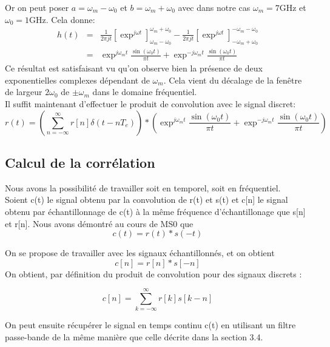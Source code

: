\documentclass[10pt,a4paper]{article}
\begin{document}
Or on peut poser $a=\omega_m-\omega_0$ et $b=\omega_m+\omega_0$ avec dans notre cas $\omega_m=7\text{GHz}$ et $\omega_0=1\text{GHz}$. Cela donne:
\begin{eqnarray*}
h(t) & = &\frac{1}{2\pi j t}\left[ \exp^{j\omega t}\right]_{\omega_m-\omega_0}^{\omega_m+\omega_0} - \frac{1}{2\pi j t}\left[ \exp^{j\omega t}\right]_{-\omega_m+\omega_0}^{-\omega_m-\omega_0}\\
& = & \exp^{j\omega_m t}\frac{\sin (\omega_0 t)}{\pi t} + \exp^{-j\omega_m t}\frac{\sin (\omega_0 t)}{\pi t}
\end{eqnarray*}
Ce résultat est satisfaisant vu qu'on observe bien la présence de deux exponentielles complexes dépendant de $\omega_m$. Cela vient du décalage de la fenêtre de largeur $2\omega_0$ de $\pm \omega_m$ dans le domaine fréquentiel.\\
Il suffit maintenant d'effectuer le produit de convolution avec le signal discret:
\begin{equation}
r(t)=\left(\sum_{n=-\infty}^{\infty}r[n]\delta (t-nT_e)\right)\ast \left( \exp^{j\omega_m t}\frac{\sin (\omega_0 t)}{\pi t} + \exp^{-j\omega_m t}\frac{\sin (\omega_0 t)}{\pi t} \right)
\end{equation}

 \subsection{Calcul de la corrélation}

Nous avons la possibilité de travailler soit en temporel, soit en fréquentiel.\\

Soient c(t) le signal obtenu par la convolution de r(t) et s(t) et c[n] le signal obtenu par échantillonnage de c(t) à la même fréquence d'échantillonage que s[n] et r[n]. Nous avons démontré au cours de MS0 que
\begin{equation}
c(t)=r(t)*s(-t)
\end{equation}

On se propose de travailler avec les signaux échantillonnés, et on obtient
\begin{equation}
c[n]=r[n]*s[-n]
\end{equation}
On obtient, par définition du produit de convolution pour des signaux discrets :

\begin{equation}
c[n]=\sum_{k=-\infty}^{\infty}r[k]s[k-n]
\end{equation}

On peut ensuite récupérer le signal en temps continu c(t) en utilisant un filtre passe-bande de la même manière que celle décrite dans la section 3.4.
\end{document}
